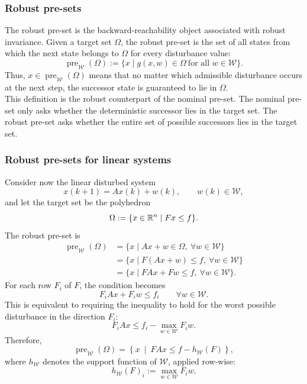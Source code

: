 \subsubsection{Robust pre-sets}

The robust pre-set is the backward-reachability object associated with robust invariance. Given a
target set \(\Omega\), the robust pre-set is the set of all states from which the next state belongs
to \(\Omega\) for every disturbance value:
\[
    \operatorname{pre}_{\mathcal{W}}(\Omega)
    :=
    \{x \mid g(x,w) \in \Omega \ \text{for all } w \in \mathcal{W}\}.
\]
Thus, \(x \in \operatorname{pre}_{\mathcal{W}}(\Omega)\) means that no matter which admissible
disturbance occurs at the next step, the successor state is guaranteed to lie in \(\Omega\).\\
This definition is the robust counterpart of the nominal pre-set. The nominal pre-set only asks
whether the deterministic successor lies in the target set. The robust pre-set asks whether the
entire set of possible successors lies in the target set.

\subsubsection{Robust pre-sets for linear systems}

Consider now the linear disturbed system
\[
    x(k+1) = Ax(k) + w(k),
    \qquad w(k) \in \mathcal{W},
\]
and let the target set be the polyhedron
\[
    \Omega := \{x \in \mathbb{R}^n \mid Fx \leq f\}.
\]
The robust pre-set is
\[
\begin{aligned}
    \operatorname{pre}_{\mathcal{W}}(\Omega)
    &=
    \{x \mid Ax+w \in \Omega,\ \forall w \in \mathcal{W}\}  \\
    &=
    \{x \mid F(Ax+w) \leq f,\ \forall w \in \mathcal{W}\}  \\
    &=
    \{x \mid FAx + Fw \leq f,\ \forall w \in \mathcal{W}\}.
\end{aligned}
\]
For each row \(F_i\) of \(F\), the condition becomes
\[
    F_iAx + F_iw \leq f_i
    \qquad \forall w \in \mathcal{W}.
\]
This is equivalent to requiring the inequality to hold for the worst possible disturbance in the
direction \(F_i\):
\[
    F_iAx \leq f_i - \max_{w \in \mathcal{W}} F_iw.
\]
Therefore,
\[
    \operatorname{pre}_{\mathcal{W}}(\Omega)
    =
    \left\{
    x \ \middle|\ 
    FAx \leq f - h_{\mathcal{W}}(F)
    \right\},
\]
where \(h_{\mathcal{W}}\) denotes the support function of \(\mathcal{W}\), applied row-wise:
\[
    h_{\mathcal{W}}(F)_i
    :=
    \max_{w \in \mathcal{W}} F_iw.
\]


